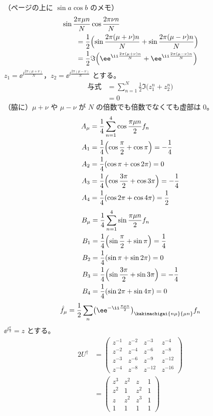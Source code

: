 （ページの上に $\sin a\cos b$ のメモ）
\begin{align*}
  &\sin\frac{2\pi\mu n}{N}\cos\frac{2\pi\nu n}{N}\\
  &\qquad=\frac{1}{2}\Bigl(\sin\frac{2\pi(\mu+\nu)n}{N}+\sin\frac{2\pi(\mu-\nu)n}{N}\Bigr)\\
  &\qquad=\frac{1}{2}\Im\Bigl(\ee^{\ii\frac{2\pi(\mu+\nu)n}{N}}+\ee^{\ii\frac{2\pi(\mu-\nu)n}{N}}\Bigr)
\end{align*}
$z_1=\ee^{\ii\frac{2\pi(\mu+\nu)}{N}}$，$z_2=\ee^{\ii\frac{2\pi(\mu-\nu)}{N}}$ とする。
\begin{align*}
  \text{与式}&=\sum_{n=1}^{N}\frac{1}{2}\Im\bigl(z_1^{n}+z_2^{n}\bigr)\\
  &=0
\end{align*}
（脇に）$\mu+\nu$ や $\mu-\nu$ が $N$ の倍数でも倍数でなくても虚部は 0。
\begin{align*}
  A_{\mu}&=\frac{1}{4}\sum_{n=1}^{4}\cos\frac{\pi\mu n}{2}f_n\\
  A_1&=\frac{1}{4}\Bigl(\cos\frac{\pi}{2}+\cos\pi\Bigr)=-\frac{1}{4}\\
  A_2&=\frac{1}{4}(\cos\pi+\cos2\pi)=0\\
  A_3&=\frac{1}{4}\Bigl(\cos\frac{3\pi}{2}+\cos3\pi\Bigr)=-\frac{1}{4}\\
  A_4&=\frac{1}{4}(\cos2\pi+\cos4\pi)=\frac{1}{2}
\end{align*}
\begin{align*}
  B_{\mu}&=\frac{1}{4}\sum_{n=1}^{4}\sin\frac{\pi\mu n}{2}f_n\\
  B_1&=\frac{1}{4}\Bigl(\sin\frac{\pi}{2}+\sin\pi\Bigr)=\frac{1}{4}\\
  B_2&=\frac{1}{4}(\sin\pi+\sin2\pi)=0\\
  B_3&=\frac{1}{4}\Bigl(\sin\frac{3\pi}{2}+\sin3\pi\Bigr)=-\frac{1}{4}\\
  B_4&=\frac{1}{4}(\sin2\pi+\sin4\pi)=0
\end{align*}
\[ \hat{f}_{\mu}=\frac{1}{2}\sum_{n}\bigl(\ee^{-\ii\frac{\pi\mu n}{2}}\bigr)_{\kakimachigai{n\mu}{\mu n}}f_n \]
$\ee^{\ii\frac{\pi}{2}}=z$ とする。
\begin{align*}
  2U^{\dagger}&=\begin{pmatrix}z^{-1}&z^{-2}&z^{-3}&z^{-4}\\z^{-2}&z^{-4}&z^{-6}&z^{-8}\\z^{-3}&z^{-6}&z^{-9}&z^{-12}\\z^{-4}&z^{-8}&z^{-12}&z^{-16}\end{pmatrix}\\
  &=\begin{pmatrix}z^{3}&z^{2}&z&1\\z^{2}&1&z^{2}&1\\z&z^{2}&z^{3}&1\\1&1&1&1\end{pmatrix}
\end{align*}

